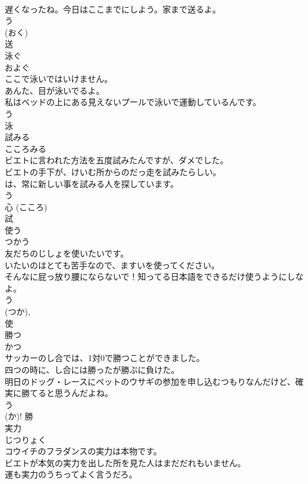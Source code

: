\documentclass[8pt]{extreport}
\begin{document}
\begin{CJK}{UTF8}{min}
\\	遅くなったね。今日はここまでにしよう。家まで送るよ。	
\\	う 
\\	(おく) 
\\	送	
\\	泳ぐ	
\\	およぐ	
\\	ここで泳いではいけません。	
\\	あんた、目が泳いでるよ。	
\\	私はベッドの上にある見えないプールで泳いで運動しているんです。	
\\	う 
\\	泳	
\\	試みる	
\\	こころみる	
\\	ビエトに言われた方法を五度試みたんですが、ダメでした。	
\\	ビエトの手下が、けいむ所からのだっ走を試みたらしい。	
\\	は、常に新しい事を試みる人を探しています。	
\\	う 
\\	心 (こころ) 
\\	試	
\\	使う	
\\	つかう	
\\	友だちのじしょを使いたいです。	
\\	いたいのはとても苦手なので、ますいを使ってください。	
\\	そんなに屁っ放り腰にならないで！知ってる日本語をできるだけ使うようにしなよ。	
\\	う 
\\	(つか), 
\\	使	
\\	勝つ	
\\	かつ	
\\	サッカーのし合では、1対0で勝つことができました。	
\\	四つの時に、し合には勝ったが勝ぶに負けた。	
\\	明日のドッグ・レースにペットのウサギの参加を申し込むつもりなんだけど、確実に勝てると思うんだよね。	
\\	う 
\\	(か)!	勝	
\\	実力	
\\	じつりょく	
\\	コウイチのフラダンスの実力は本物です。	
\\	ビエトが本気の実力を出した所を見た人はまだだれもいません。	
\\	運も実力のうちってよく言うだろ。	

\end{CJK}
\end{document}
